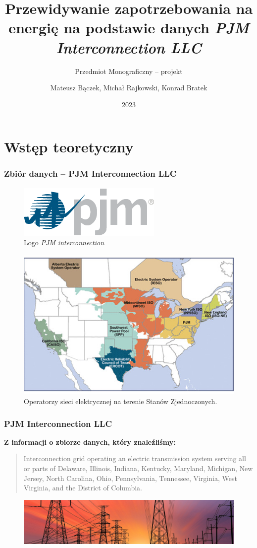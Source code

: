 \documentclass[]{beamer}
\title{Przewidywanie zapotrzebowania na energię na podstawie danych \textit{PJM Interconnection LLC}}
\subtitle{Przedmiot Monograficzny -- projekt}
\author{Mateusz Bączek, Michał Rajkowski, Konrad Bratek}
\institute{Politechnika Wrocławska}
\date{2023}
\begin{document}
\frame{\titlepage}

\section{Wstęp teoretyczny}

\begin{frame}
\frametitle{Zbiór danych -- PJM Interconnection LLC}
  \begin{figure}
    \centering
    \includegraphics[width=0.3\linewidth]{pjm-logo.png}
    \caption{Logo \textit{PJM interconnection}}
  \end{figure}
  \vspace{-0.5cm}
  \begin{figure}
    \centering
    \includegraphics[width=0.6\linewidth]{rto_map.jpg}
    \caption{Operatorzy sieci elektrycznej na terenie Stanów Zjednoczonych.}
  \end{figure}

\end{frame}

\begin{frame}
\frametitle{PJM Interconnection LLC}
  \textbf{Z informacji o zbiorze danych, który znaleźliśmy:} \\
  \begin{quote}
Interconnection grid operating an electric transmission system serving all or parts of Delaware, Illinois, Indiana, Kentucky, Maryland, Michigan, New Jersey, North Carolina, Ohio, Pennsylvania, Tennessee, Virginia, West Virginia, and the District of Columbia.
  \end{quote}

  \begin{figure}
    \centering
    \includegraphics[width=0.8\linewidth]{dataset-cover.jpg}
  \end{figure}

\end{frame}
\end{document}
